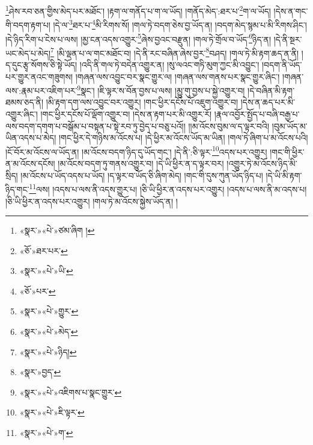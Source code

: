 \footnote{«སྣར་»«པེ་»ཙམ་ཞིག །}ཤེས་རབ་ཅན་གྱིས་མེད་པར་མཐོང་། །རྟག་ལ་གནོད་པ་ག་ལ་ཡོད། །གནོད་མེད་:ཐར་པ་\footnote{«ཅོ་»ཐར་པར་}ག་ལ་ཡོད། །དེས་ན་གང་གི་བདག་རྟག་པ། །དེ་ལ་\footnote{«སྣར་»«པེ་»ཡི་}ཐར་པ་\footnote{«ཅོ་»པར་}མི་རིགས་སོ། །གལ་ཏེ་བདག་ཅེས་བྱ་ཡོད་ན། །བདག་མེད་སྙམ་པ་མི་རིགས་ཤིང་། །དེ་ཉིད་རིག་པ་ངེས་པ་ལས། །མྱ་ངན་འདས་འགྱུར་\footnote{«སྣར་»«པེ་»གྱུར་}ཞེས་བྱའང་བརྫུན། །གལ་ཏེ་གྲོལ་བ་ཡོད་\footnote{«སྣར་»«པེ་»མེད་}ཉིད་ན། །དེ་ནི་སྔར་ཡང་མེད་པ་མེད།\footnote{«སྣར་»«པེ་»ཉིད།} །མི་ལྡན་པ་ལ་གང་མཐོང་བ། །དེ་ནི་རང་བཞིན་ཞེས་བྱར་\footnote{«སྣར་»བྱད་}བཤད། །གལ་ཏེ་མི་རྟག་ཆད་ན་ནི། །ད་དུང་རྩྭ་སོགས་ཅི་སྟེ་ཡོད། །འདི་ནི་གལ་ཏེ་བདེན་འགྱུར་ན། །སུ་ལའང་གཏི་མུག་ཀྱང་མི་འབྱུང་། །བདག་ནི་ཡོད་པར་གྱུར་ནའང་གཟུགས། །གཞན་ལས་འབྱུང་བར་སྣང་གྱུར་ལ། །གཞན་ལས་གནས་པར་སྣང་གྱུར་ཞིང་། །གཞན་ལས་:རྣམ་པར་འཇིག་པར་\footnote{«སྣར་»«པེ་»འཇིགས་པ་སྣང་གྱུར་}སྣང་། །ཇི་ལྟར་ས་བོན་བྱས་པ་ལས། །མྱུ་གུ་བྱས་པ་སྐྱེ་འགྱུར་བ། །དེ་བཞིན་མི་རྟག་ཐམས་ཅད་ནི། །མི་རྟག་དག་ལས་འབྱུང་བར་འགྱུར། །གང་ཕྱིར་དངོས་པོ་འཇུག་འགྱུར་བ། །དེས་ན་ཆད་པར་མི་འགྱུར་ཞིང་། །གང་ཕྱིར་དངོས་པོ་ལྡོག་འགྱུར་བ། །དེས་ན་རྟག་པར་མི་འགྱུར་རོ། །རྣལ་འབྱོར་སྤྱོད་པ་བཞི་བརྒྱ་པ་ལས་བདག་དགག་པ་བསྒོམ་པ་བསྟན་པ་སྟེ་རབ་ཏུ་བྱེད་པ་བཅུ་པའོ།། །།མ་འོངས་བུམ་ལ་ད་ལྟར་བའི། །བུམ་ཡོད་མ་ཡིན་འདས་པ་མེད། །གང་ཕྱིར་དེ་གཉིས་མ་འོངས་པ། །དེ་ཕྱིར་མ་འོངས་ཡོད་མ་ཡིན། །གལ་ཏེ་ཞིག་པ་མ་འོངས་པའི། །ངོ་བོར་མ་འོངས་ལ་ཡོད་ན། །མ་འོངས་བདག་ཉིད་དུ་ཡོད་གང་། །དེ་ནི་:ཅི་ལྟར་\footnote{«སྣར་»«པེ་»ཇི་ལྟར་}འདས་པར་འགྱུར། །གང་གི་ཕྱིར་ན་མ་འོངས་དངོས། །མ་འོངས་བདག་ཏུ་གནས་འགྱུར་བ། །དེ་ཡི་ཕྱིར་ན་ད་ལྟར་བར། །འགྱུར་ཏེ་མ་འོངས་ཉིད་མི་སྲིད། །མ་འོངས་པ་ཡོད་འདས་པ་ཡོད། །ད་ལྟར་བ་ཡོད་ཅི་ཞིག་མེད། །གང་གི་དུས་ཀུན་ཡོད་ཉིད་པ། །དེ་ཡི་མི་རྟག་ཉིད་གང་\footnote{«སྣར་»«པེ་»ག་}ལས། །འདས་པ་ལས་ནི་འདས་གྱུར་པ། །ཅི་ཡི་ཕྱིར་ན་འདས་པར་འགྱུར། །འདས་པ་ལས་ནི་མ་འདས་པ། །ཅི་ཡི་ཕྱིར་ན་འདས་པར་འགྱུར། །གལ་ཏེ་མ་འོངས་སྐྱེས་ཡོད་ན། །
